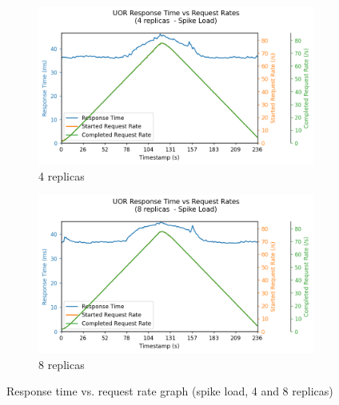 \begin{figure}[H]
    \centering
    \begin{subfigure}{.5\textwidth}
      \centering
      \includegraphics[width=\linewidth]{figures/uor-replica-count-i3-graph.png}
      \caption{4 replicas}
    \end{subfigure}%
    \begin{subfigure}{.5\textwidth}
      \centering
      \includegraphics[width=\linewidth]{figures/uor-replica-count-i4-graph.png}
      \caption{8 replicas}
    \end{subfigure}

    \caption{Response time vs. request rate graph (spike load, 4 and 8 replicas)}
    \label{figure:uor-replica-count-graph}
\end{figure}

